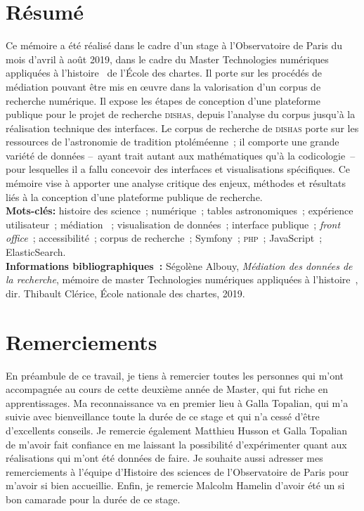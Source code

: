 \documentclass[a4paper,12pt,twoside]{book}
\newcommand{\clearemptydoublepage}{\newpage{\pagestyle{empty}\cleardoublepage}}
\newcommand\mychapter[1]{%
  \chapter*{#1}%
  \markright{\MakeUppercase{#1}}%
}
\newcommand{\eng}{\emph}
\newcommand{\php}{\textsc{php}\xspace}
\newcommand{\g}[1]{\og#1~\fg}
\begin{document}
	
	\mychapter{Résumé}
	\medskip	
	Ce mémoire a été réalisé dans le cadre d'un stage à l'Observatoire de Paris du mois d'avril à août 2019, dans le cadre du Master \g{Technologies numériques appliquées à l'histoire} de l'École des chartes. Il porte sur les procédés de médiation pouvant être mis en œuvre dans la valorisation d'un corpus de recherche numérique. Il expose les étapes de conception d'une plateforme publique pour le projet de recherche \textsc{dishas}, depuis l'analyse du corpus jusqu'à la réalisation technique des interfaces. Le corpus de recherche de \textsc{dishas} porte sur les ressources de l'astronomie de tradition ptoléméenne~; il comporte une grande variété de données –~ayant trait autant aux mathématiques qu'à la codicologie~– pour lesquelles il a fallu concevoir des interfaces et visualisations spécifiques. Ce mémoire vise à apporter une analyse critique des enjeux, méthodes et résultats liés à la conception d'une plateforme publique de recherche.\\
	
	\textbf{Mots-clés:} histoire des science~; numérique~; tables astronomiques~; expérience utilisateur~; médiation ~; visualisation de données~; interface publique~; \eng{front office}~; accessibilité~; corpus de recherche~; Symfony~; \php~; JavaScript~; ElasticSearch.\\
	
	\textbf{Informations bibliographiques~:} Ségolène Albouy, \textit{Médiation des données de la recherche}, mémoire de master \g{Technologies numériques appliquées à l'histoire}, dir. Thibault Clérice, École nationale des chartes, 2019.
	
\clearemptydoublepage
	
	\mychapter{Remerciements}
	En préambule de ce travail, je tiens à remercier toutes les personnes qui m'ont accompagnée au cours de cette deuxième année de Master, qui fut riche en apprentissages. Ma reconnaissance va en premier lieu à Galla Topalian, qui m'a suivie avec bienveillance toute la durée de ce stage et qui n'a cessé d'être d'excellents conseils. Je remercie également Matthieu Husson et Galla Topalian de m'avoir fait confiance en me laissant la possibilité d'expérimenter quant aux réalisations qui m'ont été données de faire. Je souhaite aussi adresser mes remerciements à l'équipe d'Histoire des sciences de l'Observatoire de Paris pour m'avoir si bien accueillie. Enfin, je remercie Malcolm Hamelin d’avoir été un si bon camarade pour la durée de ce stage.\\
	
\end{document}
